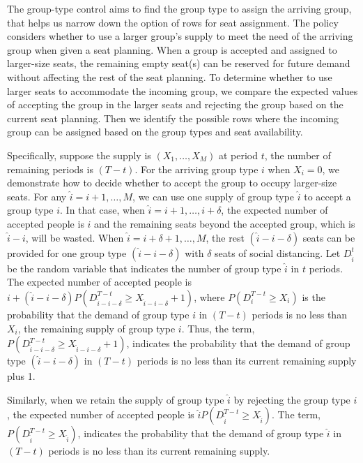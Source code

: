 The group-type control aims to find the group type to assign the arriving group, that helps us narrow down the option of rows for seat assignment. The policy considers whether to use a larger group's supply to meet the need of the arriving group when given a seat planning. When a group is accepted and assigned to larger-size seats, the remaining empty seat(s) can be reserved for future demand without affecting the rest of the seat planning. To determine whether to use larger seats to accommodate the incoming group, we compare the expected values of accepting the group in the larger seats and rejecting the group based on the current seat planning. Then we identify the possible rows where the incoming group can be assigned based on the group types and seat availability.



Specifically, suppose the supply is $(X_1, \ldots, X_M)$ at period $t$, the number of remaining periods is $(T-t)$. For the arriving group type $i$ when $X_i = 0$, we demonstrate how to decide whether to accept the group to occupy larger-size seats. For any $\hat{i}=i+1, \ldots, M$, we can use one supply of group type $\hat{i}$ to accept a group type $i$. In that case, when $\hat{i} = i+1, \ldots, i+\delta$, the expected number of accepted people is $i$ and the remaining seats beyond the accepted group, which is $\hat{i}-i$, will be wasted. When $\hat{i} = i+\delta+1, \ldots, M$, the rest $(\hat{i}-i-\delta)$ seats can be provided for one group type $(\hat{i}-i-\delta)$ with $\delta$ seats of social distancing. Let $D_{\hat{i}}^{t}$ be the random variable that indicates the number of group type $\hat{i}$ in $t$ periods. The expected number of accepted people is $i + (\hat{i}-i-\delta)P(D_{\hat{i}-i-\delta}^{T-t} \geq X_{\hat{i}-i-\delta}+1)$, where $P(D_i^{T-t} \geq X_i)$ is the probability that the demand of group type $i$ in $(T-t)$ periods is no less than $X_i$, the remaining supply of group type $i$. Thus, the term, $P(D_{\hat{i}-i-\delta}^{T-t} \geq X_{\hat{i}-i-\delta}+1)$, indicates the probability that the demand of group type $(\hat{i}-i-\delta)$ in $(T-t)$ periods is no less than its current remaining supply plus 1. 

Similarly, when we retain the supply of group type $\hat{i}$ by rejecting the group type $i$, the expected number of accepted people is $\hat{i} P(D_{\hat{i}}^{T-t} \geq X_{\hat{i}})$. The term, $P(D_{\hat{i}}^{T-t} \geq X_{\hat{i}})$, indicates the probability that the demand of group type $\hat{i}$ in $(T-t)$ periods is no less than its current remaining supply.

